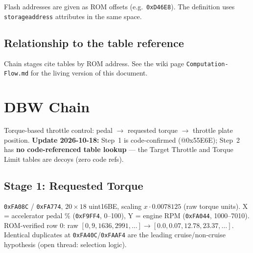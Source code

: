 \documentclass[11pt,a4paper]{book}
\begin{document}
Flash addresses are given as ROM offsets (e.g.\ \texttt{0xD46E8}). The
definition uses \texttt{storageaddress} attributes in the same space.

\section{Relationship to the table reference}

Chain stages cite tables by ROM address. See the wiki page
\texttt{Computation-Flow.md} for the living version of this document.

\chapter{DBW Chain}

Torque-based throttle control: pedal $\rightarrow$ requested torque
$\rightarrow$ throttle plate position. \textbf{Update 2026-10-18:}
Step~1 is code-confirmed (@0x55E6E); Step~2 has \textbf{no code-referenced
table lookup} --- the Target Throttle and Torque Limit tables are decoys
(zero code refs).

\begin{center}
\end{center}

\section{Stage 1: Requested Torque}

\texttt{0xFA08C} / \texttt{0xFA774}, $20\times18$ uint16BE,
scaling $x \cdot 0.0078125$ (raw torque units). X = accelerator pedal \%
(\texttt{0xF9FF4}, 0--100), Y = engine RPM (\texttt{0xFA044}, 1000--7010).
ROM-verified row 0: raw $[0, 9, 1636, 2991, \ldots] \rightarrow
[0.0, 0.07, 12.78, 23.37, \ldots]$.
Identical duplicates at \texttt{0xFA40C}/\texttt{0xFAAF4} are the leading
cruise/non-cruise hypothesis (open thread: selection logic).
\end{document}

